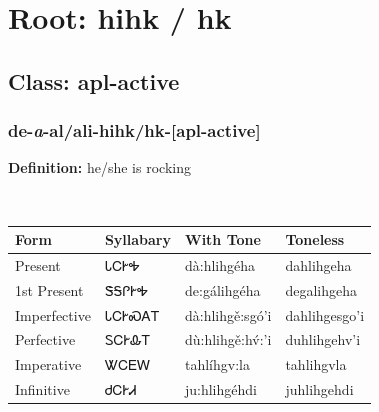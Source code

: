 \needspace{4in}
\section*{Root: hihk / hk}
\nopagebreak
{}
\needspace{3in}
\subsection*{Class: apl-active}
\nopagebreak
\needspace{2in}
\subsubsection*{de{-}\textit{a}{-}al/ali{-}\textbf{hihk/hk}{-}[apl-active]}
\nopagebreak
\textbf{Definition: } he/she is rocking
\\[0.5em]
\begin{tabularx}{\textwidth}{l X X X}%
\toprule%
\textbf{Form}&\textbf{Syllabary}&\textbf{With Tone}&\textbf{Toneless}\\%
\midrule%
Present&ᏓᏟᎨᎭ&dà:hlihgéha&dahlihgeha\\%
1st Present&ᏕᎦᎵᎨᎭ&de:gálihgéha&degalihgeha\\%
Imperfective&ᏓᏟᎨᏍᎪᎢ&dà:hlihgě:sgó’i&dahlihgesgo’i\\%
Perfective&ᏚᏟᎨᎲᎢ&dù:hlihgě:hv́:’i&duhlihgehv’i\\%
Imperative&ᏔᏟᎬᎳ&tahlíhgv:la&tahlihgvla\\%
Infinitive&ᏧᏟᎨᏗ&ju:hlihgéhdi&juhlihgehdi\\%
\bottomrule%
\end{tabularx}
\\[1em]